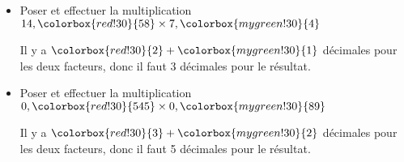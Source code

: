{
\begin{exemples*1}
    \begin{itemize}
        \item Poser et effectuer la multiplication $14,\colorbox{red!30}{58}\times 7,\colorbox{mygreen!30}{4}$\\
        \begin{center}
        \end{center}
        Il y a $\colorbox{red!30}{2}+\colorbox{mygreen!30}{1}$ décimales pour les deux facteurs, donc il faut 3 décimales pour le résultat.

        \vspace*{10mm}
        \item Poser et effectuer la multiplication $0,\colorbox{red!30}{545}\times 0,\colorbox{mygreen!30}{89}$\\
        \begin{center}
        \end{center}
        Il y a $\colorbox{red!30}{3}+\colorbox{mygreen!30}{2}$ décimales pour les deux facteurs, donc il faut 5 décimales pour le résultat.
    \end{itemize}
\end{exemples*1}
}